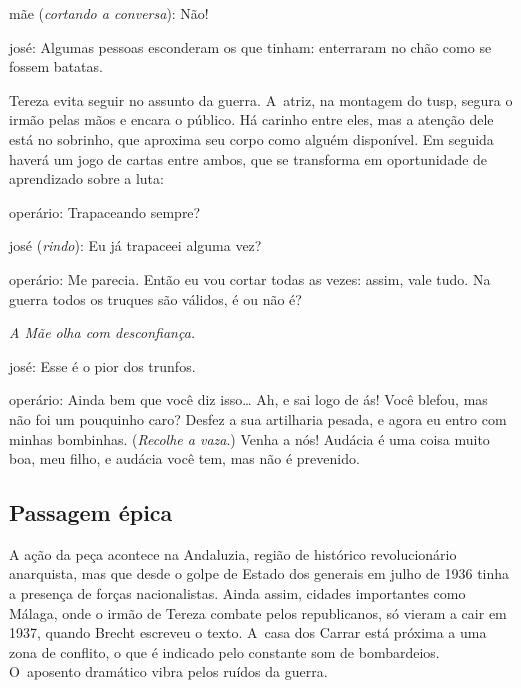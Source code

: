 {\sc mãe} ({\it cortando a conversa}): Não!

{\sc josé}: Algumas pessoas esconderam os que tinham: enterraram no chão como
se fossem batatas.
\stopblockquote

Tereza evita seguir no assunto da guerra. A~atriz, na montagem do {\sc tusp},
segura o irmão pelas mãos e encara o público. Há carinho entre eles, mas
a atenção dele está no sobrinho, que aproxima seu corpo como alguém
disponível. Em seguida haverá um jogo de cartas entre ambos, que se
transforma em oportunidade de aprendizado sobre a luta:

\startblockquote
{\sc operário}: Trapaceando sempre?

{\sc josé} ({\it rindo}): Eu já trapaceei alguma vez?

{\sc operário}: Me parecia. Então eu vou cortar todas as vezes: assim, vale
tudo. Na guerra todos os truques são válidos, é ou não é?

{\it A Mãe olha com desconfiança.}

{\sc josé}: Esse é o pior dos trunfos.

{\sc operário}: Ainda bem que você diz isso\ldots{} Ah, e sai logo de ás! Você
blefou, mas não foi um pouquinho caro? Desfez a sua artilharia pesada, e
agora eu entro com minhas bombinhas. ({\it Recolhe a vaza}.) Venha a
nós! Audácia é uma coisa muito boa, meu filho, e audácia você tem, mas
não é prevenido.
\stopblockquote


\subsection{Passagem épica}

A ação da peça acontece na Andaluzia, região de histórico revolucionário
anarquista, mas que desde o golpe de Estado dos generais em julho de
1936 tinha a presença de forças nacionalistas. Ainda assim, cidades
importantes como Málaga, onde o irmão de Tereza combate pelos
republicanos, só vieram a cair em 1937, quando Brecht escreveu o
texto. A~casa dos Carrar está próxima a uma zona de conflito, o que é
indicado pelo constante som de bombardeios. O~aposento dramático vibra
pelos ruídos da guerra.

